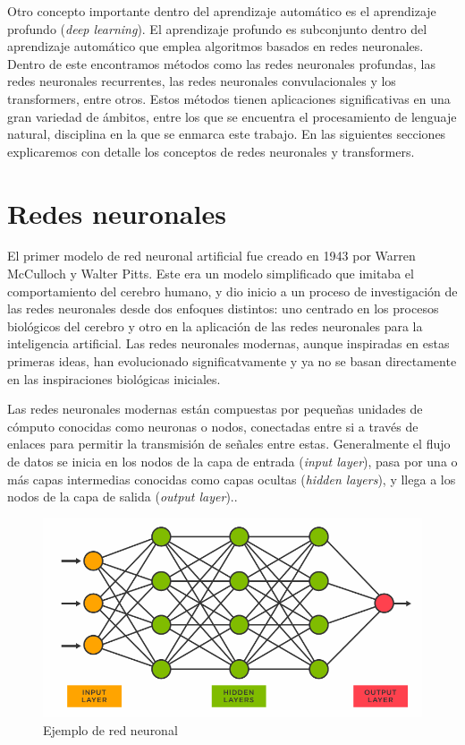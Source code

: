 \documentclass[11pt,spanish,listoffigures,listoftables]{tfgetsinf}
\begin{document}
Otro concepto importante dentro del aprendizaje automático es el aprendizaje profundo (\textit{deep learning}). El aprendizaje profundo es subconjunto dentro del aprendizaje automático que emplea algoritmos basados en redes neuronales. Dentro de este encontramos métodos como las redes neuronales profundas, las redes neuronales recurrentes, las redes neuronales convulacionales y los transformers, entre otros. Estos métodos tienen aplicaciones significativas en una gran variedad de ámbitos, entre los que se encuentra el procesamiento de lenguaje natural, disciplina en la que se enmarca este trabajo. En las siguientes secciones explicaremos con detalle los conceptos de redes neuronales y transformers.

\section{Redes neuronales}

El primer modelo de red neuronal artificial fue creado en 1943 por Warren McCulloch y Walter Pitts. Este era un modelo simplificado que imitaba el comportamiento del cerebro humano, y dio inicio a un proceso de investigación de las redes neuronales desde dos enfoques distintos: uno centrado en los procesos biológicos del cerebro y otro en la aplicación de las redes neuronales para la inteligencia artificial. Las redes neuronales modernas, aunque inspiradas en estas primeras ideas, han evolucionado significatvamente y ya no se basan directamente en las inspiraciones biológicas iniciales.

Las redes neuronales modernas están compuestas por pequeñas unidades de cómputo conocidas como neuronas o nodos, conectadas entre si a través de enlaces para permitir la transmisión de señales entre estas. Generalmente el flujo de datos se inicia en los nodos de la capa de entrada (\textit{input layer}), pasa por una o más capas intermedias conocidas como capas ocultas (\textit{hidden layers}), y llega a los nodos de la capa de salida (\textit{output layer})..

\begin{figure}[h]
\includegraphics[scale = 0.5]{images/neural_network.png}
\centering
\caption{Ejemplo de red neuronal}
\end{figure}
\end{document}
